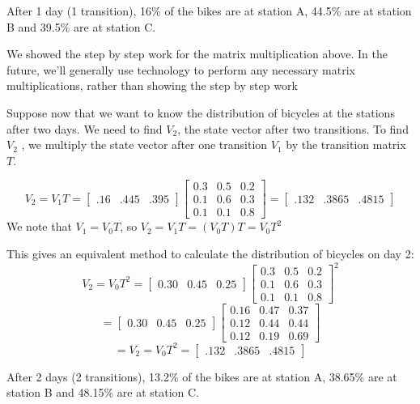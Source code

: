 After 1 day (1 transition), 16\% of the bikes are at station A, 44.5\% are at station B and  39.5\% are at station C.

We showed the step by step work for the matrix multiplication above.  In the future, we’ll generally use technology to perform any necessary matrix multiplications, rather than showing the step by step work

Suppose now that we want to know the distribution of bicycles at the stations after two days. We need to find $V_2$, the state vector after two transitions.  To find $V_2$ , we multiply the state vector after one transition $V_1$ by the transition matrix $T$.

\[
    V_{2} = V_{1}T = \begin{bmatrix} .16 & .445 & .395 \end{bmatrix}
    \begin{bmatrix}
        0.3 & 0.5 & 0.2 \\
        0.1 & 0.6 & 0.3 \\
        0.1 & 0.1 & 0.8
    \end{bmatrix}
    = \begin{bmatrix} .132 & .3865 & .4815 \end{bmatrix}
\]
We note that \( V_{1} = V_{0}T \), so \( V_{2} = V_{1}T = (V_{0}T)T = V_{0}T^2 \)

This gives an equivalent method to calculate the distribution of bicycles on day 2:
\[
    V_2 = V_0T^2 = \begin{bmatrix}
        0.30 & 0.45 & 0.25
    \end{bmatrix}
    \begin{bmatrix}
        0.3 & 0.5 & 0.2 \\
        0.1 & 0.6 & 0.3 \\
        0.1 & 0.1 & 0.8
    \end{bmatrix}^2
\]
\[
    = \begin{bmatrix}
        0.30 & 0.45 & 0.25
    \end{bmatrix}
    \begin{bmatrix}
        0.16 & 0.47 & 0.37 \\
        0.12 & 0.44 & 0.44 \\
        0.12 & 0.19 & 0.69
    \end{bmatrix}
\]
\[
    = V_2 = V_0T^2 = \begin{bmatrix}
        .132 & .3865 & .4815
    \end{bmatrix}
\]

After 2 days (2 transitions), 13.2\% of the bikes are at station A, 38.65\% are at station B and 48.15\% are at station C.


